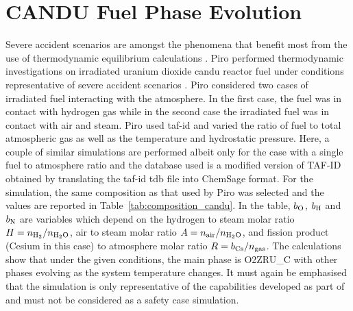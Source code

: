 \section{CANDU Fuel Phase Evolution}
Severe accident scenarios are amongst the phenomena that benefit most from the use of thermodynamic equilibrium calculations \cite{Piro:2021aa}. Piro performed thermodynamic investigations on irradiated uranium dioxide \gls{candu} reactor fuel under conditions representative of severe accident scenarios \cite{Piro:2022aa}. Piro considered two cases of irradiated fuel interacting with the atmosphere. In the first case, the fuel was in contact with hydrogen gas while in the second case the irradiated fuel was in contact with air and steam.  Piro used \gls{taf-id} \cite{Gueneau15,Gueneau:2021aa} and varied the ratio of fuel to total atmospheric gas as well as the temperature and hydrostatic pressure. Here, a couple of similar simulations are performed albeit only for the case with a single fuel to atmosphere ratio and the database used is a modified version of TAF-ID obtained by translating the \gls{taf-id} tdb file into ChemSage format. For the simulation, the same composition as that used by Piro was selected and the values are reported in Table~\ref{tab:composition_candu}. In the table, $b_{\ce{O}}$, $b_{\ce{H}}$ and $b_{\ce{N}}$ are variables which depend on the hydrogen to steam molar ratio $H = n_{\ce{H2}} / n_{\ce{H2O}}$, air to steam molar ratio $A = n_{\text{air}} / n_{\ce{H2O}}$, and fission product (Cesium in this case) to atmosphere molar ratio $R = b_{\ce{Cs}} / n_{\text{gas}}$. The calculations show that under the given conditions, the main phase is O2ZRU\_C with other phases evolving as the system temperature changes. It must again be emphasised that the simulation is only representative of the capabilities developed as part of {\GEM} and must not be considered as a safety case simulation. 
